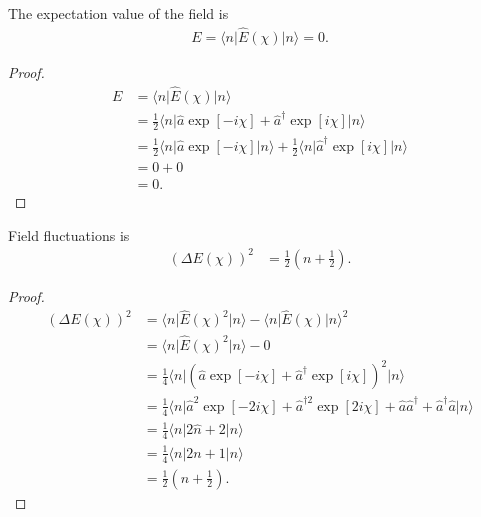\documentclass[../../note.tex]{subfiles}
\begin{document}
\begin{lemma}
    The expectation value of the field is
    \begin{align}
        E = \langle n \vert \hat{E}(\chi) \vert n \rangle = 0.
    \end{align}
\end{lemma}
\begin{proof}
    \begin{align}
        E 
        &= \langle n \vert \hat{E}(\chi) \vert n \rangle \\
        &= \frac{1}{2} \langle n \vert \hat{a} \exp[-i \chi] + \hat{a}^\dagger \exp[i \chi] \vert n \rangle \\
        &= \frac{1}{2} \langle n \vert \hat{a} \exp[-i \chi] \vert n \rangle + \frac{1}{2} \langle n \vert \hat{a}^\dagger \exp[i \chi] \vert n \rangle \\
        &= 0 + 0 \\
        &= 0.
    \end{align}
\end{proof}

\begin{lemma}
    Field fluctuations is
    \begin{align}
        (\Delta E(\chi))^2
        &= \frac{1}{2} (n+\frac{1}{2}).
    \end{align}
\end{lemma}
\begin{proof}
    \begin{align}
        (\Delta E(\chi))^2
        &= \langle n \vert \hat{E}(\chi)^2 \vert n \rangle - \langle n \vert \hat{E}(\chi) \vert n \rangle^2 \\
        &= \langle n \vert \hat{E}(\chi)^2 \vert n \rangle - 0 \\
        &= \frac{1}{4} \langle n \vert (\hat{a}\exp[-i \chi] + \hat{a}^\dagger \exp[i \chi])^2 \vert n \rangle \\
        &= \frac{1}{4} \langle n \vert \hat{a}^2 \exp[-2 i \chi] + \hat{a}^{\dagger 2} \exp[2 i \chi] + \hat{a}\hat{a}^\dagger + \hat{a}^\dagger \hat{a} \vert n \rangle \\
        &= \frac{1}{4} \langle n \vert 2 \hat{n} + 2 \vert n \rangle \\
        &= \frac{1}{4} \langle n \vert 2 n + 1 \vert n \rangle \\
        &= \frac{1}{2} (n+\frac{1}{2}).
    \end{align}
\end{proof}
\end{document}
